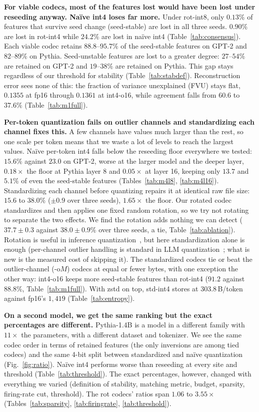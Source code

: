 \documentclass{article}
\begin{document}
\textbf{For viable codecs, most of the features lost would have been
lost under reseeding anyway. Na\"ive int4 loses far more.} Under
rot-int8, only $0.13\%$ of features that survive seed change
(seed-stable) are lost in all three seeds. $0.90\%$ are lost in
rot-int4 while $24.2\%$ are lost in na\"ive int4
(Table~\ref{tab:consensus}). Each viable codec retains
$88.8$--$95.7\%$ of the seed-stable features on GPT-2 and $82$--$89\%$
on Pythia. Seed-unstable features are lost to a greater degree:
$27$--$54\%$ are retained on GPT-2 and $19$--$38\%$ are retained on
Pythia. This gap stays regardless of our threshold for stability
(Table~\ref{tab:stabdef}). Reconstruction error sees none of this: the
fraction of variance unexplained (FVU) stays flat, $0.1355$ at fp16
through $0.1361$ at int4-o16, while agreement falls from $60.6$ to
$37.6\%$ (Table~\ref{tab:m1full}).

\textbf{Per-token quantization fails on outlier channels and
standardizing each channel fixes this.} A few channels have values
much larger than the rest, so one scale per token means that we waste
a lot of levels to reach the largest values. Na\"ive per-token int4
falls below the reseeding floor everywhere we tested: $15.6\%$ against
$23.0$ on GPT-2, worse at the larger model and the deeper layer,
$0.18\times$ the floor at Pythia layer 8 and $0.05\times$ at layer 16,
keeping only $13.7$ and $5.1\%$ of even the seed-stable features
(Tables~\ref{tab:m4l8}, \ref{tab:m4l16}). Standardizing each channel
before quantizing repairs it at identical raw file size: $15.6$ to
$38.0\%$ ($\pm 0.9$ over three seeds), $1.65\times$ the floor. Our
rotated codec standardizes and then applies one fixed random rotation,
so we try not rotating to separate the two effects. We find the
rotation adds nothing we can detect ($37.7 \pm 0.3$ against
$38.0 \pm 0.9\%$ over three seeds, a tie, Table~\ref{tab:ablation}).
Rotation is useful in inference quantization~\citep{quarot}, but here
standardization alone is enough (per-channel outlier handling is
standard in LLM quantization~\citep{llmint8,smoothquant,kivi}; what is
new is the measured cost of skipping it). The standardized
codecs tie or beat the outlier-channel (-o$M$) codecs at equal or
fewer bytes, with one exception the other way: int4-o16 keeps more
seed-stable features than rot-int4 ($91.2$ against $88.8\%$,
Table~\ref{tab:m1full}). With zstd on top, std-int4 stores at
$303.8$\,B/token against fp16's $1{,}419$ (Table~\ref{tab:entropy}).

\textbf{On a second model, we get the same ranking but the exact
percentages are different.} Pythia-1.4B is a model in a different
family with $11\times$ the parameters, with a different dataset and
tokenizer. We see the same codec order in terms of retained features
(the only inversions are among tied codecs) and the same 4-bit split
between standardized and na\"ive quantization (Fig.~\ref{fig:ratio}).
Na\"ive int4 performs worse than reseeding at every site and threshold
(Table~\ref{tab:threshold}).
The exact percentages, however, changed with
everything we varied (definition of stability, matching metric, budget,
sparsity, firing-rate cut, threshold). The rot codecs' ratios span
$1.06$ to $3.55\times$ (Tables~\ref{tab:sparsity}, \ref{tab:firingrate},
\ref{tab:threshold}).
\end{document}
